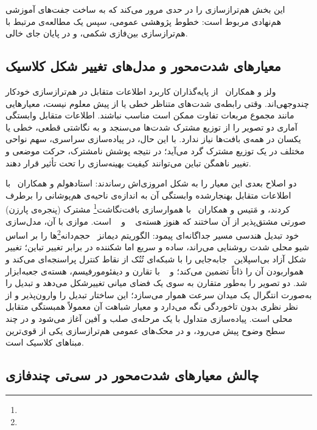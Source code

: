 این بخش هم‌ترازسازی را در حدی مرور می‌کند که به ساخت جفت‌های آموزشی هم‌نهادی مربوط است: خطوط پژوهشی عمومی، سپس یک مطالعه‌ی مرتبط با هم‌ترازسازی بین‌فازی شکمی، و در پایان جای خالی.

\subsection*{معیارهای شدت‌محور و مدل‌های تغییر شکل کلاسیک}


ولز و همکاران~\cite{wells1996} از پایه‌گذاران کاربرد اطلاعات متقابل در هم‌ترازسازی خودکار چندوجهی‌اند. وقتی رابطه‌ی شدت‌های متناظر خطی یا از پیش معلوم نیست، معیارهایی مانند مجموع مربعات تفاوت ممکن است مناسب نباشند. اطلاعات متقابل وابستگی آماری دو تصویر را از توزیع مشترک شدت‌ها می‌سنجد و به نگاشتی قطعی، خطی یا یکسان در همه‌ی بافت‌ها نیاز ندارد. با این حال، در پیاده‌سازی سراسری، سهم نواحی مختلف در یک توزیع مشترک گرد می‌آید؛ در نتیجه پوشش نامشترک، حرکت موضعی و تغییر ناهمگن تباین می‌توانند کیفیت بهینه‌سازی را تحت تأثیر قرار دهند.

دو اصلاح بعدی این معیار را به شکل امروزی‌اش رساندند: استادهولم و همکاران~\cite{studholme1999} با اطلاعات متقابل بهنجارشده وابستگی آن به اندازه‌ی ناحیه‌ی هم‌پوشانی را برطرف کردند، و مَتیس و همکاران~\cite{mattes2001} با هموارسازی بافت‌نگاشت\footnote{} مشترک (پنجره‌ی پارزن) صورتی مشتق‌پذیر از آن ساختند که هنوز هسته‌ی ~\cite{klein2010} و ~\cite{lowekamp2013} است. موازی با آن، مدل‌سازی خود تبدیل هندسی مسیر جداگانه‌ای پیمود: الگوریتم دیمانز~\cite{thirion1998} حجم‌دانه\footnote{}‌ها را بر اساس شیو محلی شدت روشنایی می‌راند، ساده و سریع اما شکننده در برابر تغییر تباین؛ تغییر شکل آزاد بی‌اسپلاین~\cite{rueckert1999} جابه‌جایی را با شبکه‌ای تُنُک از نقاط کنترل پراسنجه‌ای می‌کند و هموار‌بودن آن را ذاتاً تضمین می‌کند؛ و ~\cite{avants2008} با تقارن و دیفئومورفیسم، هسته‌ی جعبه‌ابزار  شد.  دو تصویر را به‌طور متقارن به سوی یک فضای میانی تغییرشکل می‌دهد و تبدیل را به‌صورت انتگرال یک میدان سرعت هموار می‌سازد؛ این ساختار تبدیل را وارون‌پذیر و از نظر نظری بدون تاخوردگی نگه می‌دارد و معیار شباهت آن معمولاً همبستگی متقابل محلی است. پیاده‌سازی متداول  با یک مرحله‌ی صلب و آفین آغاز می‌شود و در چند سطح وضوح پیش می‌رود، و در محک‌های عمومی هم‌ترازسازی یکی از قوی‌ترین مبناهای کلاسیک است.

\subsection*{چالش معیارهای شدت‌محور در سی‌تی چندفازی}


